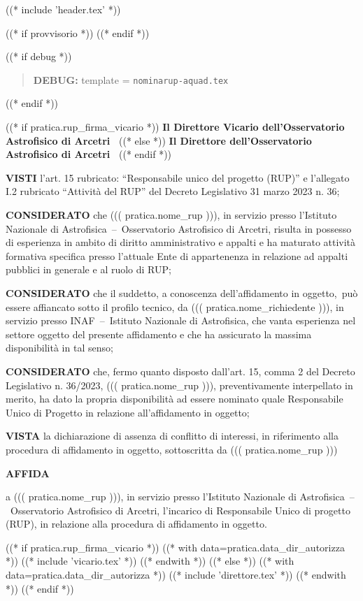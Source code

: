 
((* include 'header.tex' *))

((* if provvisorio *))
((* endif *))


\topaddr

((* if debug *))
\begin{quotation}
	\textbf{DEBUG:} template = \texttt{nominarup-aquad.tex}
\end{quotation}
((* endif *))

\begin{center}
((* if pratica.rup_firma_vicario *))
\textbf{Il Direttore Vicario dell’Osservatorio Astrofisico di Arcetri }
((* else *))
\textbf{Il Direttore dell’Osservatorio Astrofisico di Arcetri }
((* endif *))
\end{center}

\textbf{VISTI}	l’art. 15 rubricato: ``Responsabile unico del progetto (RUP)'' e l’allegato I.2 rubricato
``Attività del RUP'' del Decreto Legislativo 31 marzo 2023 n. 36;

\textbf{CONSIDERATO} 	che ((( pratica.nome_rup ))), in servizio presso l’Istituto Nazionale di
Astrofisica~–~Osservatorio Astrofisico di Arcetri, risulta in possesso di esperienza in ambito di diritto
amministrativo e appalti e ha maturato attività formativa specifica presso l’attuale Ente di appartenenza
in relazione ad appalti pubblici in generale e al ruolo di RUP;

\textbf{CONSIDERATO} che il suddetto, a conoscenza dell’affidamento in oggetto, può essere affiancato sotto il
profilo tecnico, da ((( pratica.nome_richiedente ))), in servizio presso INAF~–~Istituto Nazionale di
Astrofisica, che vanta esperienza nel settore oggetto del presente affidamento e che ha assicurato la
massima disponibilità in tal senso;

\textbf{CONSIDERATO} 	che, fermo quanto disposto dall’art. 15, comma 2 del Decreto Legislativo n. 36/2023,
((( pratica.nome_rup ))), preventivamente interpellato in merito, ha dato la propria disponibilità ad
essere nominato quale Responsabile Unico di Progetto in relazione all’affidamento in oggetto;

\textbf{VISTA}	la dichiarazione di assenza di conflitto di interessi, in riferimento alla procedura di affidamento
in oggetto, sottoscritta da ((( pratica.nome_rup )))

\begin{center}
	\textbf{AFFIDA}
\end{center}

a ((( pratica.nome_rup ))), in servizio presso l’Istituto Nazionale di Astrofisica~–~Osservatorio
Astrofisico di Arcetri, l’incarico di Responsabile Unico di progetto (RUP), in relazione alla procedura
di affidamento in oggetto.

((* if pratica.rup_firma_vicario *))
((* with data=pratica.data_dir_autorizza *))
((* include 'vicario.tex' *))
((* endwith *))
((* else *))
((* with data=pratica.data_dir_autorizza *))
((* include 'direttore.tex' *))
((* endwith *))
((* endif *))

